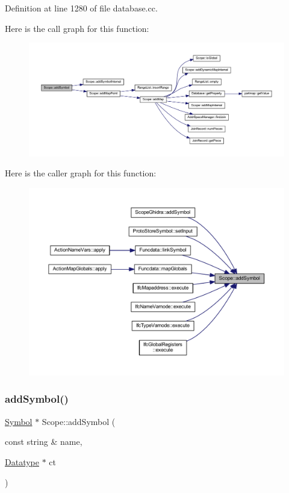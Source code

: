 Definition at line 1280 of file database.\+cc.

Here is the call graph for this function\+:
\nopagebreak
\begin{figure}[H]
\begin{center}
\leavevmode
\includegraphics[width=350pt]{class_scope_a7c79f7f535ba4e819fcf95185896a019_cgraph}
\end{center}
\end{figure}
Here is the caller graph for this function\+:
\nopagebreak
\begin{figure}[H]
\begin{center}
\leavevmode
\includegraphics[width=350pt]{class_scope_a7c79f7f535ba4e819fcf95185896a019_icgraph}
\end{center}
\end{figure}
\mbox{\label{class_scope_a96e7adcd07f0dbd9cf1777e2b3be9fe2}} 
\subsubsection{\texorpdfstring{addSymbol()}{addSymbol()}\hspace{0.1cm}{\footnotesize\ttfamily [2/2]}}
{\footnotesize\ttfamily \mbox{\hyperlink{class_symbol}{Symbol}} $\ast$ Scope\+::add\+Symbol (\begin{DoxyParamCaption}\item[{const string \&}]{name,  }\item[{\mbox{\hyperlink{class_datatype}{Datatype}} $\ast$}]{ct }\end{DoxyParamCaption})}



